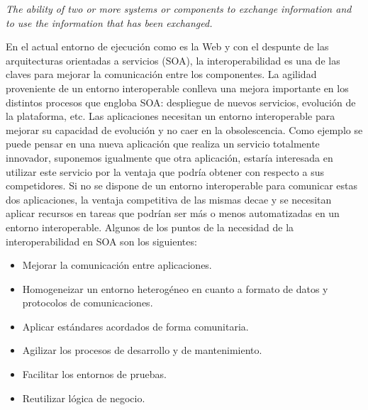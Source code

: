 \textit{The ability of two or more systems or components to exchange information
and to use the information that has been exchanged.}

En el actual entorno de ejecución como es la Web y con el despunte
de las arquitecturas orientadas a servicios (\gls{SOA}), la interoperabilidad es una de las claves para mejorar la comunicación
entre los componentes. La agilidad proveniente de un entorno interoperable conlleva una mejora importante en los distintos procesos que engloba SOA:
despliegue de nuevos servicios, evolución de la plataforma, etc. Las aplicaciones necesitan un entorno interoperable para mejorar su capacidad de
evolución y no caer en la obsolescencia. Como ejemplo se puede pensar en una nueva aplicación que realiza un servicio totalmente innovador, 
suponemos igualmente que otra aplicación, estaría interesada en utilizar este servicio por la ventaja que 
podría obtener con respecto a sus competidores. Si no se dispone de un entorno interoperable para comunicar estas dos aplicaciones, la ventaja competitiva de
las mismas decae y se necesitan aplicar recursos en tareas que podrían ser más o menos automatizadas en un entorno interoperable. Algunos de
los puntos de la necesidad de la interoperabilidad en SOA son los siguientes:

\begin{itemize}
 \item Mejorar la comunicación entre aplicaciones.
 \item Homogeneizar un entorno heterogéneo en cuanto a formato de datos y protocolos de comunicaciones.
\item Aplicar estándares acordados de forma comunitaria.
\item Agilizar los procesos de desarrollo y de mantenimiento.
\item Facilitar los entornos de pruebas.
\item Reutilizar lógica de negocio.
\end{itemize}

